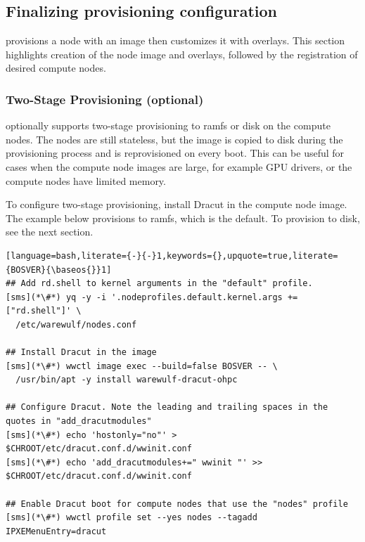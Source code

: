 \subsection{Finalizing provisioning configuration} \label{sec:assemble_bootstrap}

\Warewulf{} provisions a node with an image then customizes it with overlays.
This section highlights creation of the node image and overlays, followed by the
registration of desired compute nodes.

\subsubsection{Two-Stage Provisioning (optional)}

\Warewulf{} optionally supports two-stage provisioning to ramfs or disk on the
compute nodes. The nodes are still stateless, but the image is copied to disk
during the provisioning process and is reprovisioned on every boot. This can be
useful for cases when the compute node images are large, for example GPU
drivers, or the compute nodes have limited memory.

To configure two-stage provisioning, install Dracut in the compute node image.
The example below provisions to ramfs, which is the default. To provision to
disk, see the next section.

\begin{lstlisting}[language=bash,literate={-}{-}1,keywords={},upquote=true,literate={BOSVER}{\baseos{}}1]
## Add rd.shell to kernel arguments in the "default" profile.
[sms](*\#*) yq -y -i '.nodeprofiles.default.kernel.args += ["rd.shell"]' \
  /etc/warewulf/nodes.conf

## Install Dracut in the image
[sms](*\#*) wwctl image exec --build=false BOSVER -- \
  /usr/bin/apt -y install warewulf-dracut-ohpc

## Configure Dracut. Note the leading and trailing spaces in the quotes in "add_dracutmodules"
[sms](*\#*) echo 'hostonly="no"' > $CHROOT/etc/dracut.conf.d/wwinit.conf
[sms](*\#*) echo 'add_dracutmodules+=" wwinit "' >> $CHROOT/etc/dracut.conf.d/wwinit.conf

## Enable Dracut boot for compute nodes that use the "nodes" profile
[sms](*\#*) wwctl profile set --yes nodes --tagadd IPXEMenuEntry=dracut
\end{lstlisting}

